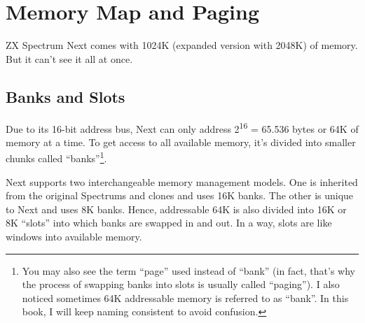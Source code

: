\section{Memory Map and Paging}
\label{zx_next_memorypaging}


\newcommand{\MemEmpty}{\multicolumn{1}{c}{}}
\newcommand{\MemArrow}[1]{\multicolumn{1}{c}{\IfEq{#1}{<}{\LArrowLine{1em}}{\RArrowLine{1em}}}}

ZX Spectrum Next comes with 1024K (expanded version with 2048K) of memory. But it can't see it all at once.


\subsection{Banks and Slots}

Due to its 16-bit address bus, Next can only address 2\textsuperscript{16} = 65.536 bytes or 64K of memory at a time. To get access to all available memory, it's divided into smaller chunks called ``banks''\footnote{You may also see the term ``page'' used instead of ``bank'' (in fact, that's why the process of swapping banks into slots is usually called ``paging''). I also noticed sometimes 64K addressable memory is referred to as ``bank''. In this book, I will keep naming consistent to avoid confusion.}.

Next supports two interchangeable memory management models. One is inherited from the original Spectrums and clones and uses 16K banks. The other is unique to Next and uses 8K banks. Hence, addressable 64K is also divided into 16K or 8K ``slots'' into which banks are swapped in and out. In a way, slots are like windows into available memory.

